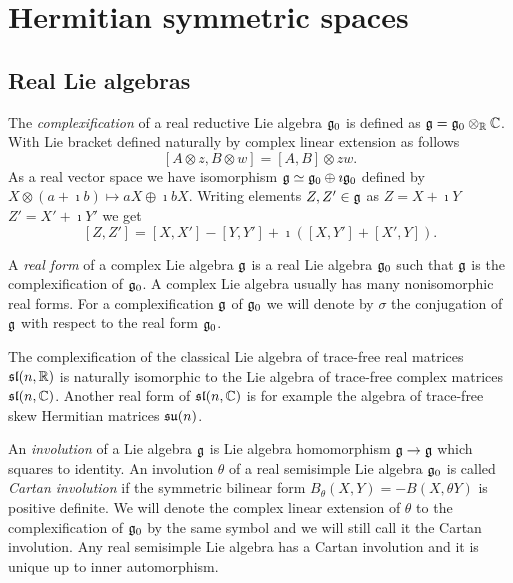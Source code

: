 \chapter{Hermitian symmetric spaces}\label{ch:hermitian}


\section{Real Lie algebras}

The \emph{complexification} of a real reductive Lie algebra $\mathfrak{g}_0$ is defined as $\mathfrak{g} = \mathfrak{g}_0\otimes_{\mathbb{R}} \mathbb{C}$. With Lie bracket defined naturally by complex linear extension as follows
\[
 [A\otimes z, B\otimes w] = [A,B]\otimes zw.
\]
As a real vector space we have isomorphism $\mathfrak{g} \simeq \mathfrak{g}_0 \oplus \imath \mathfrak{g}_0$ defined by $X\otimes (a+\imath b) \mapsto aX \oplus \imath bX$. Writing elements $Z,Z'\in\mathfrak{g}$ as $Z = X + \imath Y$ $Z'=X'+\imath Y'$ we get \[[Z,Z'] = [X,X'] - [Y,Y'] + \imath \left( [X,Y'] + [X',Y]\right).\]

A \emph{real form} of a complex Lie algebra $\mathfrak{g}$ is a real Lie algebra $\mathfrak{g}_0$ such that $\mathfrak{g}$ is the complexification of $\mathfrak{g}_0$. A complex Lie algebra usually has many nonisomorphic real forms. For a complexification $\mathfrak{g}$ of $\mathfrak{g}_0$ we will denote by $\sigma$ the conjugation of $\mathfrak{g}$ with respect to the real form $\mathfrak{g}_0$.

\begin{example}
 The complexification of the classical Lie algebra of trace-free real matrices $\mathfrak{sl}(n,\mathbb{R})$ is naturally isomorphic to the Lie algebra of trace-free complex matrices $\mathfrak{sl}(n,\mathbb{C})$. Another real form of $\mathfrak{sl}(n,\mathbb{C})$ is for example the algebra of trace-free skew Hermitian  matrices  $\mathfrak{su}(n)$. %
\end{example}

An \emph{involution} of a Lie algebra $\mathfrak{g}$ is Lie algebra homomorphism $\mathfrak{g}\to\mathfrak{g}$ which squares to identity. An involution $\theta$ of a real semisimple Lie algebra $\mathfrak{g}_0$ is called \emph{Cartan involution} if the symmetric bilinear form $B_\theta(X,Y) = -B(X,\theta Y)$ is positive definite. We will denote the complex linear extension of $\theta$ to the complexification of $\mathfrak{g}_0$ by the same symbol and we will still call it the Cartan involution. Any real semisimple Lie algebra has a Cartan involution and it is unique up to inner automorphism.


